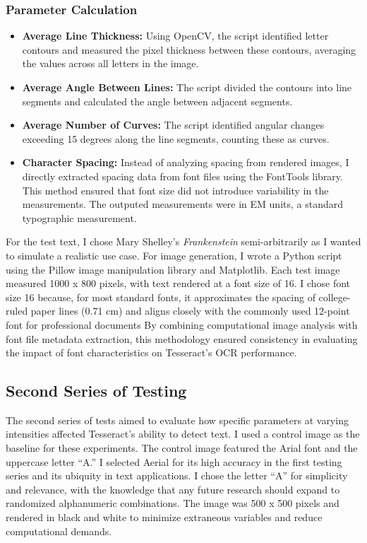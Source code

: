 \documentclass[10pt,twocolumn]{article}
\begin{document}
\subsubsection{Parameter Calculation}
\begin{itemize}
\item \textbf{Average Line Thickness:} Using OpenCV, the script identified letter contours and measured the pixel thickness between these contours, averaging the values across all letters in the image.
\item \textbf{Average Angle Between Lines:} The script divided the contours into line segments and calculated the angle between adjacent segments.
\item \textbf{Average Number of Curves:} The script identified angular changes exceeding 15 degrees along the line segments, counting these as curves.
\item \textbf{Character Spacing:} Instead of analyzing spacing from rendered images, I directly extracted spacing data from font files using the FontTools library. This method ensured that font size did not introduce variability in the measurements. The outputed measurements were in EM units, a standard typographic measurement. 

\end{itemize}
For the test text, I chose Mary Shelley’s \textit{Frankenstein} semi-arbitrarily as I wanted to simulate a realistic use case. For image generation, I wrote a Python script using the Pillow image manipulation library and Matplotlib. Each test image measured 1000 x 800 pixels, with text rendered at a font size of 16. I chose font size 16 because, for most standard fonts, it approximates the spacing of college-ruled paper lines (0.71 cm) and aligns closely with the commonly used 12-point font for professional documents
By combining computational image analysis with font file metadata extraction, this methodology ensured consistency in evaluating the impact of font characteristics on Tesseract’s OCR performance.

\subsection{Second Series of Testing}
The second series of tests aimed to evaluate how specific parameters at varying intensities affected Tesseract’s ability to detect text. I used a control image as the baseline for these experiments. The control image featured the Arial font and the uppercase letter “A.” I selected Aerial for its high accuracy in the first testing series and its ubiquity in text applications. I chose the letter  “A” for simplicity and relevance, with the knowledge that any  future research should expand to randomized alphanumeric combinations. The image was 500 x 500 pixels and rendered in black and white to minimize extraneous variables and reduce computational demands.
\end{document}
